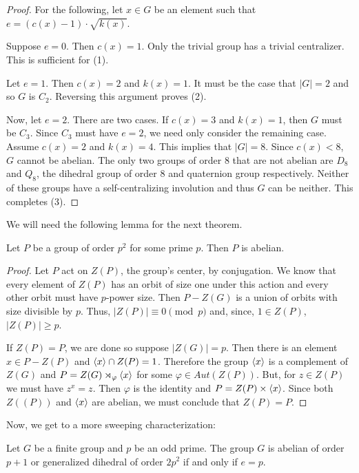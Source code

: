 \documentclass[main.tex]{subfiles}
\begin{document}
\begin{proof}
For the following, let $x \in G$ be an element such that $e = (c(x) - 1) \cdot \sqrt{k(x)}$.


Suppose $e = 0$. Then $c(x) = 1$. Only the trivial group has a trivial centralizer. This is sufficient for (1).

Let $e = 1$. Then $c(x) = 2$ and $k(x) = 1$. It must be the case that $|G| = 2$ and so $G$ is $C_2$. Reversing this argument proves (2).

Now, let $e = 2$. There are two cases. If $c(x) = 3$ and $k(x) = 1$, then $G$ must be $C_3$. Since $C_3$ must have $e = 2$, we need only consider the remaining case. Assume $c(x) = 2$ and $k(x) = 4$. This implies that $|G| = 8$. Since $c(x) < 8$, $G$ cannot be abelian. The only two groups of order 8 that are not abelian are $D_8$ and $Q_8$, the dihedral group of order 8 and quaternion group respectively. Neither of these groups have a self-centralizing involution and thus $G$ can be neither. This completes (3).
\end{proof}

We will need the following lemma for the next theorem.

\begin{lemma}\label{psquared}
Let $P$ be a group of order $p^2$ for some prime $p$. Then $P$ is abelian.
\end{lemma}

\begin{proof}
Let $P$ act on $Z(P)$, the group's center, by conjugation. We know that every element of $Z(P)$ has an orbit of size one under this action and every other orbit must have $p$-power size. Then $P - Z(G)$ is a union of orbits with size divisible by $p$. Thus, $|Z(P)| \equiv 0 \pmod{p}$ and, since, $1 \in Z(P)$, $|Z(P)| \ge p$. 

If $Z(P) = P$, we are done so suppose $|Z(G)| = p$. Then there is an element $x \in P - Z(P)$ and $\langle x \rangle \cap Z(P) = 1$. Therefore the group $\langle x \rangle$ is  a complement of $Z(G)$ and $P = Z(G) \rtimes_\varphi \langle x \rangle$ for some $\varphi \in Aut(Z(P))$. But, for $z \in Z(P)$ we must have $z^x = z$. Then $\varphi$ is the identity and $P = Z(P) \times \langle x \rangle$. Since both $Z((P))$ and $\langle x \rangle$ are abelian, we must conclude that $Z(P) = P$.
\end{proof}

Now, we get to a more sweeping characterization:

\begin{theorem}
Let $G$ be a finite group and $p$ be an odd prime. The group $G$ is abelian of order $p+1$ or generalized dihedral of order $2p^2$ if and only if $e = p$.
\end{theorem}
\end{document}
